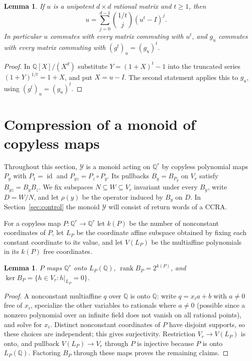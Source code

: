\documentclass[11pt,letterpaper]{article}
\newcommand{\Q}{\mathbb{Q}}
\newcommand{\cY}{\mathcal{Y}}
\newcommand{\id}{\operatorname{id}}
\newtheorem{lemma}[theorem]{Lemma}
\theoremstyle{definition}
\begin{document}
\begin{lemma}\label{lem:root}
If $u$ is a unipotent $d\times d$ rational matrix and $t\ge1$, then
\[
u=\sum_{j=0}^{d-1}\binom{1/t}{j}(u^t-I)^j.
\] In particular $u$ commutes with every matrix commuting with $u^t$, and $g_u$ commutes with every matrix commuting with $(g^t)_u=(g_u)^t$.
\end{lemma}
\begin{proof}
In $\Q[X]/(X^d)$ substitute $Y=(1+X)^t-1$ into the truncated series $(1+Y)^{1/t}=1+X$, and put $X=u-I$. The second statement applies this to $g_u$, using $(g^t)_u=(g_u)^t$.
\end{proof}

\section{Compression of a monoid of copyless maps}\label{sec:compression}
Throughout this section, $\cY$ is a monoid acting on $\Q^r$ by copyless polynomial maps $P_y$ with $P_1=\id$ and $P_{yz}=P_z\circ P_y$. Its pullbacks $B_y=B_{P_y}$ on $V_r$ satisfy $B_{yz}=B_yB_z$. We fix subspaces $N\subseteq W\subseteq V_r$ invariant under every $B_y$, write $D=W/N$, and let $\rho(y)$ be the operator induced by $B_y$ on $D$. In Section~\ref{sec:control} the monoid $\cY$ will consist of return words of a CCRA.

For a copyless map $P:\Q^r\to\Q^r$ let $k(P)$ be the number of nonconstant coordinates of $P$, let $L_P$ be the coordinate affine subspace obtained by fixing each constant coordinate to its value, and let $V(L_P)$ be the multiaffine polynomials in its $k(P)$ free coordinates.

\begin{lemma}\label{lem:image}
$P$ maps $\Q^r$ onto $L_P(\Q)$, $\operatorname{rank}B_P=2^{k(P)}$, and $\ker B_P=\{h\in V_r:h|_{L_P}=0\}$.
\end{lemma}
\begin{proof}
A nonconstant multiaffine $q$ over $\Q$ is onto $\Q$: write $q=x_ia+b$ with $a\ne0$ free of $x_i$, specialize the other variables to rationals where $a\ne0$ (possible since a nonzero polynomial over an infinite field does not vanish on all rational points), and solve for $x_i$. Distinct nonconstant coordinates of $P$ have disjoint supports, so these choices are independent; this gives surjectivity. Restriction $V_r\to V(L_P)$ is onto, and pullback $V(L_P)\to V_r$ through $P$ is injective because $P$ is onto $L_P(\Q)$. Factoring $B_P$ through these maps proves the remaining claims.
\end{proof}
\end{document}
